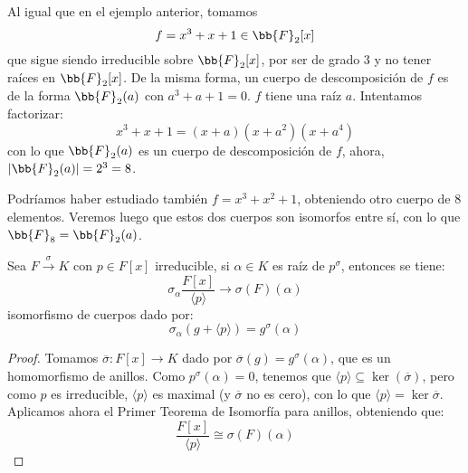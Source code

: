 \begin{ejemplo}
    Al igual que en el ejemplo anterior, tomamos
    \begin{equation*}
        f = x^3+x+1 \in \bb{F}_2[x]
    \end{equation*}
    que sigue siendo irreducible sobre $\bb{F}_2[x]$, por ser de grado 3 y no tener raíces en $\bb{F}_2[x]$. De la misma forma, un cuerpo de descomposición de $f$ es de la forma $\bb{F}_2(a)$ con $a^3+a+1=0$. $f$ tiene una raíz $a$. Intentamos factorizar: %
    \begin{equation*}
        x^3+x+1 = (x+a)(x+a^2)(x+a^4)
    \end{equation*}
    con lo que $\bb{F}_2(a)$ es un cuerpo de descomposición de $f$, ahora, $|\bb{F}_2(a)| = 2^3 = 8$.

    \noindent
    Podríamos haber estudiado también $f=x^3+x^2+1$, obteniendo otro cuerpo de $8$ elementos. Veremos luego que estos dos cuerpos son isomorfos entre sí, con lo que $\bb{F}_8 = \bb{F}_2(a)$.
\end{ejemplo}

\begin{lema}
    Sea $F\stackrel{\sigma}{\to}{K}$ con $p\in F[x]$ irreducible, si $\alpha\in K$ es raíz de $p^\sigma$, entonces se tiene:
    \begin{equation*}
        \sigma_\alpha \dfrac{F[x]}{\langle p \rangle }\to \sigma(F)(\alpha)
    \end{equation*}
    isomorfismo de cuerpos dado por:
    \begin{equation*}
        \sigma_\alpha(g+\langle p \rangle ) = g^\sigma(\alpha)
    \end{equation*}
    \begin{proof}
        Tomamos $\overline{\sigma}:F[x]\to K$ dado por $\overline{\sigma}(g) = g^\sigma(\alpha)$, que es un homomorfismo de anillos. Como $p^\sigma(\alpha)=0$, tenemos que $\langle p \rangle \subseteq \ker(\overline{\sigma})$, pero como $p$ es irreducible, $\langle p \rangle $ es maximal (y $\overline{\sigma}$ no es cero), con lo que $\langle p \rangle =\ker\overline{\sigma}$. Aplicamos ahora el Primer Teorema de Isomorfía para anillos, obteniendo que:
        \begin{equation*}
            \dfrac{F[x]}{\langle p \rangle } \cong \sigma(F)(\alpha)
        \end{equation*}
    \end{proof}
\end{lema}

